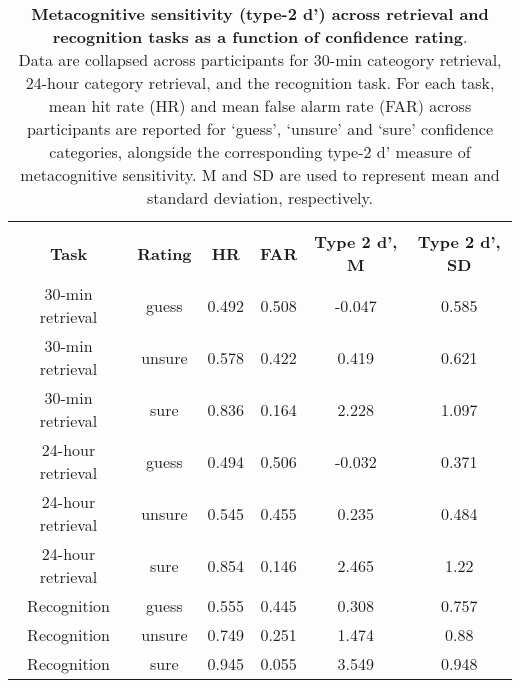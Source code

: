\begin{fullwidth}
\begin{table}[!ht]
    \centering
    \begin{tabular}{c|c|c|c|c|c}
            \multicolumn{6}{c}{\textbf{}} \\
        \textbf{Task} & \textbf{Rating} & \textbf{HR} & \textbf{FAR} & \textbf{Type 2 d', M } & \textbf{Type 2 d', SD} \\ \hline
        30-min retrieval & guess & 0.492 & 0.508 & -0.047 & 0.585 \\ 
        30-min retrieval & unsure & 0.578 & 0.422 & 0.419 & 0.621 \\ 
        30-min retrieval & sure & 0.836 & 0.164 & 2.228 & 1.097 \\ 
        24-hour retrieval & guess & 0.494 & 0.506 & -0.032 & 0.371 \\ 
        24-hour retrieval & unsure & 0.545 & 0.455 & 0.235 & 0.484 \\ 
        24-hour retrieval & sure & 0.854 & 0.146 & 2.465 & 1.22 \\ 
        Recognition & guess & 0.555 & 0.445 & 0.308 & 0.757 \\ 
        Recognition & unsure & 0.749 & 0.251 & 1.474 & 0.88 \\ 
        Recognition & sure & 0.945 & 0.055 & 3.549 & 0.948 \\ 
    \end{tabular}
\vspace{1.0 em}
    \caption{\textbf{Metacognitive sensitivity (type-2 d') across retrieval and recognition tasks as a function of confidence rating}. \\
    Data are collapsed across participants for 30-min cateogory retrieval, 24-hour category retrieval, and the recognition task. For each task, mean hit rate (HR) and mean false alarm rate (FAR) across participants are reported for ‘guess’, ‘unsure’ and ‘sure’ confidence categories, alongside the corresponding type-2 d' measure of metacognitive sensitivity. M and SD are used to represent mean and standard deviation, respectively.}
    \label{tab:Label}
\end{table}
\end{fullwidth}

